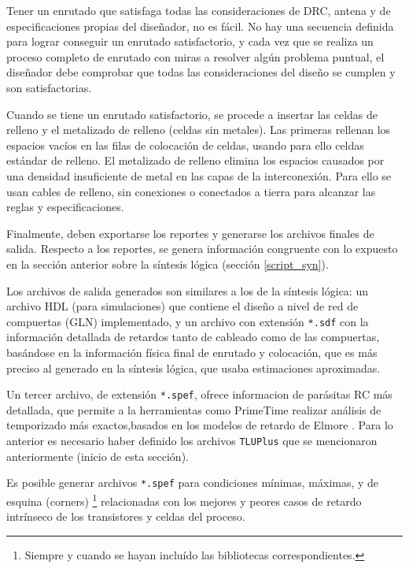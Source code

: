 Tener un enrutado que satisfaga todas las consideraciones de DRC, antena y de especificaciones propias del diseñador, no es fácil. No hay una secuencia definida para lograr conseguir un enrutado satisfactorio, y cada vez que se realiza un proceso completo de enrutado con miras a resolver algún problema puntual, el diseñador debe comprobar que todas las consideraciones del diseño se cumplen y son satisfactorias.

Cuando se tiene un enrutado satisfactorio, se procede a insertar las celdas de relleno y el metalizado de relleno (celdas sin metales). Las primeras rellenan los espacios vacíos en las filas de colocación de celdas, usando para ello celdas estándar de relleno. El metalizado de relleno elimina los espacios causados por una densidad insuficiente de metal en las capas de la interconexión. Para ello se usan cables de relleno, sin conexiones o conectados a tierra para alcanzar las reglas y especificaciones.

Finalmente, deben exportarse los reportes y generarse los archivos finales de salida. Respecto a los reportes, se genera información congruente con lo expuesto en la sección anterior sobre la síntesis lógica (sección \ref{script_syn}).

Los archivos de salida generados son similares a los de la síntesis lógica: un archivo HDL (para simulaciones) que contiene el diseño a nivel de red de compuertas (GLN) implementado, y un archivo con extensión \texttt{*.sdf} con la información detallada de retardos tanto de cableado como de las compuertas, basándose en la información física final de enrutado y colocación, que es más preciso al generado en la síntesis lógica, que usaba estimaciones aproximadas.

Un tercer archivo, de extensión \texttt{*.spef}, ofrece informacion de parásitas RC más detallada, que permite a la herramientas como PrimeTime realizar análisis de temporizado más exactos,basados en los modelos de retardo de Elmore \cite{book:weste2005}. Para lo anterior es necesario haber definido los archivos \texttt{TLUPlus} que se mencionaron anteriormente (inicio de esta sección).


Es posible generar archivos \texttt{*.spef} para condiciones mínimas, máximas, y de esquina (corners) \footnote{Siempre y cuando se hayan incluído las bibliotecas correspondientes.} relacionadas con los mejores y peores casos de retardo intrínseco de los transistores y celdas del proceso.

